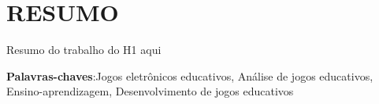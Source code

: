 \noindent\chapter*{\uppercase{Resumo}}

Resumo do trabalho do H1 aqui
  
\vspace{1cm}

\noindent \textbf{Palavras-chaves}:Jogos eletrônicos educativos, Análise de jogos educativos, Ensino-aprendizagem, Desenvolvimento de jogos educativos